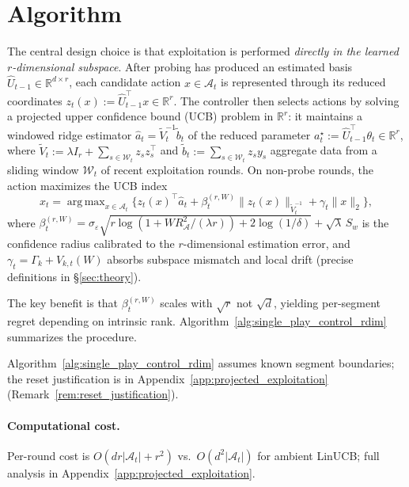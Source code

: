 \documentclass{article}
\newcommand{\R}{\mathbb{R}}
\newcommand{\cA}{\mathcal{A}}
\DeclareMathOperator*{\argmax}{arg\,max}
\begin{document}

\section{Algorithm}
\label{sec:algorithm}

The central design choice is that exploitation is performed \emph{directly in the learned $r$-dimensional subspace}. After probing has produced an estimated basis $\widehat U_{t-1}\in\R^{d\times r}$, each candidate action $x\in\cA_t$ is represented through its reduced coordinates $z_t(x) := \widehat U_{t-1}^\top x \in \R^r.$
The controller then selects actions by solving a projected upper confidence bound (UCB) problem in $\R^r$: it maintains a windowed ridge estimator $\widehat a_t = \widetilde V_t^{-1}\widetilde b_t$ of the reduced parameter $a_t^\star := \widehat U_{t-1}^\top \theta_t \in \R^r$, where $\widetilde V_t := \lambda I_r + \sum_{s \in \mathcal{W}_t} z_s z_s^\top$ and $\widetilde b_t := \sum_{s \in \mathcal{W}_t} z_s y_s$ aggregate data from a sliding window $\mathcal{W}_t$ of recent exploitation rounds. On non-probe rounds, the action maximizes the UCB index
\[
x_t = \argmax_{x \in \cA_t}\bigl\{z_t(x)^\top \widehat a_t + \beta_t^{(r,W)}\|z_t(x)\|_{\widetilde V_t^{-1}} + \gamma_t\|x\|_2\bigr\},
\]
where $\beta_t^{(r,W)} = \sigma_\varepsilon\sqrt{r\log(1 + WR_{\cA}^2/(\lambda r)) + 2\log(1/\delta)} + \sqrt{\lambda}\,S_w$ is the confidence radius calibrated to the $r$-dimensional estimation error, and $\gamma_t = \Gamma_k + V_{k,t}(W)$ absorbs subspace mismatch and local drift (precise definitions in \S\ref{sec:theory}).

The key benefit is that $\beta_t^{(r,W)}$ scales with $\sqrt{r}$ not $\sqrt{d}$, yielding per-segment regret depending on intrinsic rank. Algorithm~\ref{alg:single_play_control_rdim} summarizes the procedure.

Algorithm~\ref{alg:single_play_control_rdim} assumes known segment boundaries; the reset justification is in Appendix~\ref{app:projected_exploitation} (Remark~\ref{rem:reset_justification}).

\paragraph{Computational cost.}
Per-round cost is $O(dr|\cA_t| + r^2)$ vs.\ $O(d^2|\cA_t|)$ for ambient LinUCB; full analysis in Appendix~\ref{app:projected_exploitation}.
\end{document}
